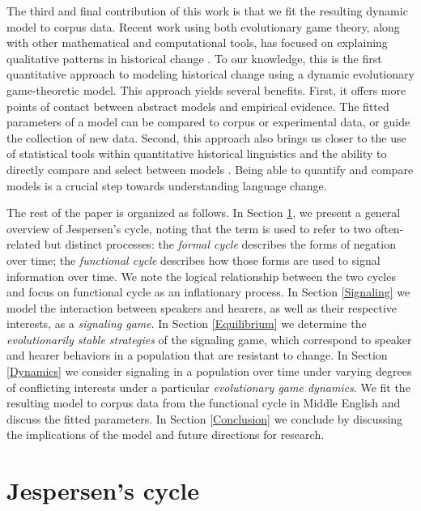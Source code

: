 \documentclass[linguex]{sp}
\theoremstyle{definition} \newtheorem{definition}{Definition}
\begin{document}
The third and final contribution of this work is that we fit the resulting dynamic model to corpus data. Recent work using both evolutionary game theory, along with other mathematical and computational tools, has focused on explaining qualitative patterns in historical change \citep{schaden2012, deo2015, yanovich2015, yanovich2016, enke2016}. To our knowledge, this is the first quantitative approach to modeling historical change using a dynamic evolutionary game-theoretic model. This approach yields several benefits. First, it offers more points of contact between abstract models and empirical evidence. The fitted parameters of a model can be compared to corpus or experimental data, or guide the collection of new data. Second, this approach also brings us closer to the use of statistical tools within quantitative historical linguistics \citep{kroch1989,altmann-etal1983} and the ability to directly compare and select between models \citep{burnham2003}. Being able to quantify and compare models is a crucial step towards understanding language change.

The rest of the paper is organized as follows. In Section \ref{Jespersen's cycle}, we present a general overview of Jespersen's cycle, noting that the term is used to refer to two often-related but distinct processes: the \emph{formal cycle} describes the forms of negation over time; the \emph{functional cycle} describes how those forms are used to signal information over time. We note the logical relationship between the two cycles and focus on functional cycle as an inflationary process. In Section \ref{Signaling} we model the interaction between speakers and hearers, as well as their respective interests, as a \emph{signaling game}. In Section \ref{Equilibrium} we determine the \emph{evolutionarily stable strategies} of the signaling game, which correspond to speaker and hearer behaviors in a population that are resistant to change. In Section \ref{Dynamics} we consider signaling in a population over time under varying degrees of conflicting interests under a particular \emph{evolutionary game dynamics}. We fit the resulting model to corpus data from the functional cycle in Middle English and discuss the fitted parameters. In Section \ref{Conclusion} we conclude by discussing the implications of the model and future directions for research.


\section{Jespersen's cycle}
\label{Jespersen's cycle}
\end{document}

